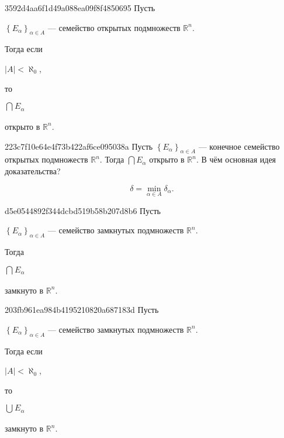 \begin{note}{3592d4aa6f1d49a088ea09f8f4850695}
    Пусть \begin{icloze}{4}\({ \left\{ E_\alpha \right\}_{\alpha \in A} }\) --- семейство открытых подмножеств \({ \mathbb R^{n} }\).\end{icloze}
    Тогда если \begin{icloze}{3}\({ \left\lvert A \right\rvert < \aleph_0 }\),\end{icloze} то \begin{icloze}{2}\({ \bigcap_{}^{} E_\alpha }\)\end{icloze} \begin{icloze}{1}открыто в \({ \mathbb R^{n} }\).\end{icloze}
\end{note}

\begin{note}{223c7f10e64e4f73b422af6ce095038a}
    Пусть \({ \left\{ E_\alpha \right\}_{\alpha \in A} }\) --- конечное семейство открытых подмножеств \({ \mathbb R^{n} }\).
    Тогда \({ \bigcap E_\alpha }\) открыто в \({ \mathbb R^{n} }\).
    В чём основная идея доказательства?

    \begin{cloze}{1}
        \[
            \delta = \min_{\alpha \in A} \delta_\alpha.
        \]
    \end{cloze}
\end{note}

\begin{note}{d5e0544892f344dcbd519b58b207d8b6}
    Пусть \begin{icloze}{3}\({ \left\{ E_\alpha \right\}_{\alpha \in A} }\) --- семейство замкнутых подмножеств \({ \mathbb R^{n} }\).\end{icloze}
    Тогда \begin{icloze}{2}\({ \bigcap_{}^{} E_\alpha }\)\end{icloze} \begin{icloze}{1}замкнуто в \({ \mathbb R^{n} }\).\end{icloze}
\end{note}

\begin{note}{203fb961ea984b4195210820a687183d}
    Пусть \begin{icloze}{4}\({ \left\{ E_\alpha \right\}_{\alpha \in A} }\) --- семейство замкнутых подмножеств \({ \mathbb R^{n} }\).\end{icloze}
    Тогда если \begin{icloze}{3}\({ \left\lvert A \right\rvert < \aleph_0 }\),\end{icloze} то \begin{icloze}{2}\({ \bigcup_{}^{} E_\alpha }\)\end{icloze} \begin{icloze}{1}замкнуто в \({ \mathbb R^{n} }\).\end{icloze}
\end{note}

